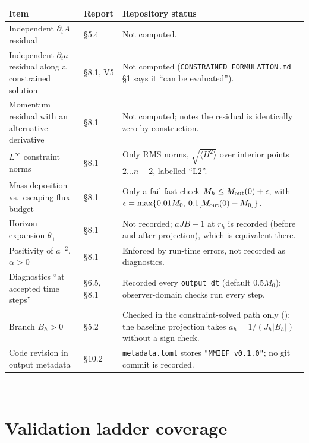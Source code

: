 \documentclass[11pt,a4paper]{article}
\makeatletter
\newcommand{\dt}{\partial_t}
\newcommand{\needlines}[1]{\par\penalty-100\begingroup
  \setlength{\dimen@}{#1\baselineskip}\dimen@ii\pagegoal\advance\dimen@ii-\pagetotal
  \ifdim\dimen@>\dimen@ii\ifdim\dimen@ii>\z@\vfil\fi\penalty-\@M\fi\endgroup}
\makeatother
\begin{document}
\small
\begin{longtable}{@{}L{5.2cm}L{1.9cm}L{8.6cm}@{}}
\toprule
\textbf{Item} & \textbf{Report} & \textbf{Repository status}\\
\midrule
\endhead
Independent $\dt A$ residual & \S5.4 & Not computed.\\
Independent $\dt a$ residual along a constrained solution & \S8.1, V5 & Not computed (\texttt{CONSTRAINED\_FORMULATION.md} \S1 says it ``can be evaluated'').\\
Momentum residual with an alternative derivative & \S8.1 & Not computed;  notes the residual is identically zero by construction.\\
$L^\infty$ constraint norms & \S8.1 & Only RMS norms, $\sqrt{\langle H^2\rangle}$ over interior points $2\ldots n-2$, labelled ``L2''.\\
Mass deposition vs.\ escaping flux budget & \S8.1 & Only a fail-fast check $M_h\le M_{\rm out}(0)+\epsilon$, with $\epsilon=\max\{0.01M_0,\,0.1[M_{\rm out}(0)-M_0]\}$.\\
Horizon expansion $\theta_+$ & \S8.1 & Not recorded; $aJB-1$ at $r_h$ is recorded (before and after projection), which is equivalent there.\\
Positivity of $a^{-2}$, $\alpha>0$ & \S8.1 & Enforced by run-time errors, not recorded as diagnostics.\\
Diagnostics ``at accepted time steps'' & \S6.5, \S8.1 & Recorded every \texttt{output\_dt} (default $0.5M_0$); observer-domain checks run every step.\\
Branch $B_h>0$ & \S5.2 & Checked in the constraint-solved path only (); the baseline projection takes $a_h=1/(J_h|B_h|)$ without a sign check.\\
Code revision in output metadata & \S10.2 & \texttt{metadata.toml} stores \texttt{"MMIEF v0.1.0"}; no git commit is recorded.\\
\bottomrule
\end{longtable}
\normalsize

\needlines{10}
\section{Validation ladder coverage}\label{sec:ladder}
\end{document}
